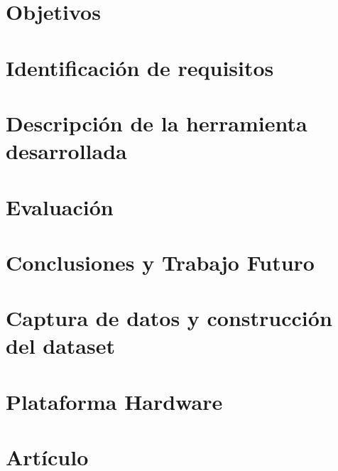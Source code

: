 \documentclass[11pt,a4paper,spanish]{book}
\begin{document}
\chapter{Objetivos}\label{chap:objetivos}


\chapter{Identificación de requisitos}\label{chap:requisitos}


\chapter{Descripción de la herramienta desarrollada}\label{chap:descripcion}
%

\chapter{Evaluación}\label{chap:eval}
%

\chapter{Conclusiones y Trabajo Futuro}\label{chap:conclusiones}
%


%
%
\newpage %



\appendix

\chapter{Captura de datos y construcción del dataset}\label{app:dataset}


\chapter{Plataforma Hardware}\label{app:plataforma}


\chapter{Artículo}

\listoftodos
\end{document}
